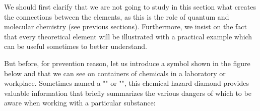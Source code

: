 	We should first clarify that we are not going to study in this section what creates the connections between the elements, as this is the role of quantum and molecular chemistry (see previous sections). Furthermore, we insist on the fact that every theoretical element will be illustrated with a practical example which can be useful sometimes to better understand.
	
	But before, for prevention reason, let us introduce a symbol shown in the figure below and that we can see on containers of chemicals in a laboratory or workplace. Sometimes named a "" or "", this chemical hazard diamond provides valuable information that briefly summarizes the various dangers of which to be aware when working with a particular
substance:
	\begin{figure}[H]
		\centering
		\begin{tikzpicture}[x=0.75pt,y=0.75pt,yscale=-1,xscale=1]
		

\end{tikzpicture}
\end{figure}
